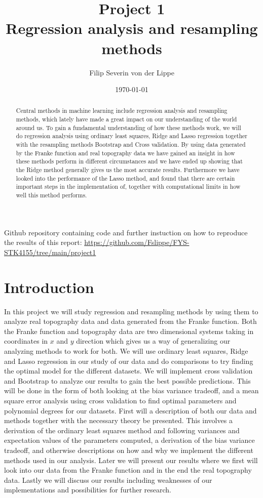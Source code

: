 \documentclass[12pt]{article}
\title{Project 1\\ Regression analysis and resampling methods}
\author{Filip Severin von der Lippe}
\date{\today}
\begin{document}
\maketitle
Github repository containing code and further instuction on how to reproduce the results of this report: \url{https://github.com/Fslippe/FYS-STK4155/tree/main/project1}
\begin{abstract}
  Central methods in machine learning include regression analysis and resampling methods, which lately have made a great impact on our understanding of the world around us. To gain a fundamental understanding of how these methods work, we will do regression analysis using ordinary least squares, Ridge and Lasso regression together with the resampling methods Bootstrap and Cross validation. By using data generated by the Franke function and real topography data we have gained an insight in how these methods perform in different circumstances and we have ended up showing that the Ridge method generally gives us the most accurate results. Furthermore we have looked into the performance of the Lasso method, and found that there are certain important steps in the implementation of, together with computational limits in how well this method performs.
\end{abstract}
\newpage
\tableofcontents
\section{Introduction}
In this project we will study regression and resampling methods by using them to analyze real topography data and data generated from the Franke function. Both the Franke function and topography data are two dimensional systems taking in coordinates in $x$ and $y$ direction which gives us a way of generalizing our analyzing methods to work for both. We will use ordinary least squares, Ridge and Lasso regression in our study of our data and do comparisons to try finding the optimal model for the different datasets. We will implement cross validation and Bootstrap to analyze our results to gain the best possible predictions. This will be done in the form of both looking at the bias variance tradeoff, and a mean square error analysis using cross validation to find optimal parameters and polynomial degrees for our datasets. First will a description of both our data and methods together with the necessary theory be presented. This involves a derivation of the ordinary least squares method and following variances and expectation values of the parameters computed, a derivation of the bias variance tradeoff, and otherwise descriptions on how and why we implement the different methods used in our analysis. Later we will present our results where we first will look into our data from the Franke function and in the end the real topography data. Lastly we will discuss our results including weaknesses of our implementations and possibilities for further research.
\end{document}
